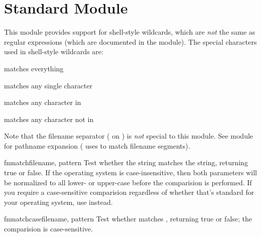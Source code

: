 \section{Standard Module }
\label{module-fnmatch}

This module provides support for \UNIX{} shell-style wildcards, which
are \emph{not} the same as regular expressions (which are documented
in the  module).  The special characters
used in shell-style wildcards are:

\begin{list}{}{\leftmargin 0.5in }
\item[\code{*}] matches everything
\item[\code{?}]	matches any single character
\item[\code{[}\var{seq}\code{]}] matches any character in 
\item[\code{[!}\var{seq}\code{]}] matches any character not in 
\end{list}

Note that the filename separator ( on \UNIX{}) is \emph{not}
special to this module.  See module 
for pathname expansion ( uses  to
match filename segments).


\begin{funcdesc}{fnmatch}{filename, pattern}
Test whether the  string matches the 
string, returning true or false.  If the operating system is
case-insensitive, then both parameters will be normalized to all
lower- or upper-case before the comparision is performed.  If you
require a case-sensitive comparision regardless of whether that's
standard for your operating system, use 
instead.
\end{funcdesc}

\begin{funcdesc}{fnmatchcase}{filename, pattern}
Test whether  matches , returning true or
false; the comparision is case-sensitive.
\end{funcdesc}

\begin{seealso}
\end{seealso}
